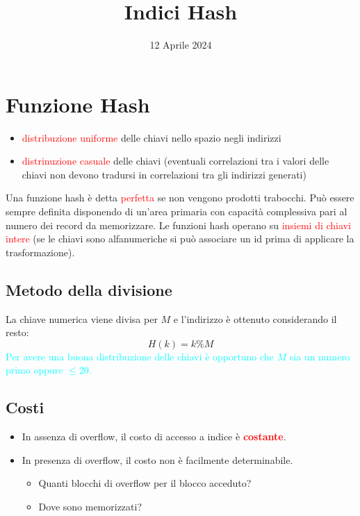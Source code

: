 \documentclass[12pt]{article}
\title{Indici Hash}
\date{12 Aprile 2024}
\begin{document}
\maketitle
\section{Funzione Hash}
\begin{itemize}
    \item \textcolor{red}{distribuzione uniforme} delle chiavi nello spazio negli indirizzi
    \item \textcolor{red}{distrinuzione casuale} delle chiavi (eventuali correlazioni
    tra i valori delle chiavi non devono tradursi in
    correlazioni tra gli indirizzi generati)
\end{itemize}
Una funzione hash è detta \textcolor{red}{perfetta} se non vengono prodotti trabocchi. Può essere sempre definita disponendo di un'area primaria con capacità complessiva pari al numero dei record da memorizzare. Le funzioni hash operano su \textcolor{red}{insiemi di chiavi intere} (se le chiavi sono alfanumeriche si può associare un id prima di applicare la trasformazione).
\subsection{Metodo della divisione}
La chiave numerica viene divisa per $M$ e l'indirizzo è ottenuto considerando il resto:
\begin{equation*}
    H(k)=k \% M
\end{equation*}
\textcolor{Cyan}{Per avere una buona distribuzione delle chiavi è opportuno che $M$ sia un numero primo oppure $\leq 20$.}
\subsection{Costi}
\begin{itemize}
    \item In assenza di overflow, il costo di accesso a indice è \textbf{\textcolor{red}{costante}}.
    \item In presenza di overflow, il costo non è facilmente determinabile. \begin{itemize}
        \item Quanti blocchi di overflow per il blocco acceduto?
        \item Dove sono memorizzati?
    \end{itemize}
\end{itemize}
\end{document}
